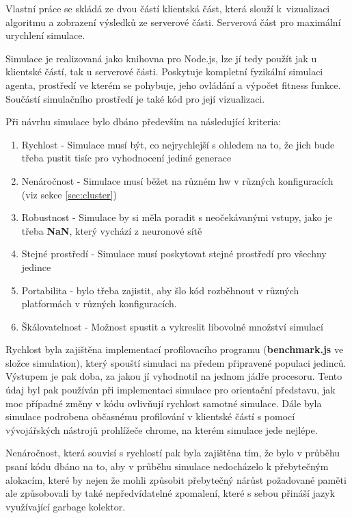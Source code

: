 


Vlastní práce se skládá ze dvou částí klientská část, která slouží k~vizualizaci algoritmu a zobrazení výsledků ze serverové části. Serverová část pro maximální urychlení simulace. 

Simulace je realizovaná jako knihovna pro Node.js, lze jí tedy použít jak u klientské částí, tak u serverové části. Poskytuje kompletní fyzikální simulaci agenta, prostředí ve kterém se pohybuje, jeho ovládání a výpočet fitness funkce. Součástí simulačního prostředí je také kód pro její vizualizaci.

Při návrhu simulace bylo dbáno především na následující kriteria:

\begin{enumerate}
	\item Rychlost - Simulace musí být, co nejrychlejší s ohledem na to, že jich bude třeba pustit tisíc pro vyhodnocení jediné generace
	\item Nenáročnost - Simulace musí běžet na různém hw v různých konfiguracích (viz sekce \ref{sec:cluster})
	\item Robustnost - Simulace by si měla poradit s neočekávanými vstupy, jako je třeba \textbf{NaN}, který vychází z neuronové sítě
	\item Stejné prostředí - Simulace musí poskytovat stejné prostředí pro všechny jedince
	\item Portabilita - bylo třeba zajistit, aby šlo kód rozběhnout v různých platformách v různých konfiguracích.
	\item Škálovatelnost - Možnost spustit a vykreslit libovolné množství simulací
\end{enumerate}

Rychlost byla zajištěna implementací profilovacího programu (\textbf{benchmark.js} ve složce simulation), který spouští simulaci na předem připravené populaci jedinců. Výstupem je pak doba, za jakou jí vyhodnotil na jednom jádře procesoru. Tento údaj byl pak používán při implementaci simulace pro orientační představu, jak moc případné změny v kódu ovlivňují rychlost samotné simulace. Dále byla simulace podrobena občasnému profilování v klientské částí s pomocí vývojářských nástrojů prohlížeče chrome, na kterém simulace jede nejlépe.

Nenáročnost, která souvisí s rychlostí pak byla zajištěna tím, že bylo v průběhu psaní kódu dbáno na to, aby v průběhu simulace nedocházelo k přebytečným alokacím, které by nejen že mohli způsobit přebytečný nárůst požadované paměti ale způsobovali by také nepředvídatelné zpomalení, které s sebou přináší jazyk využívající garbage kolektor.

